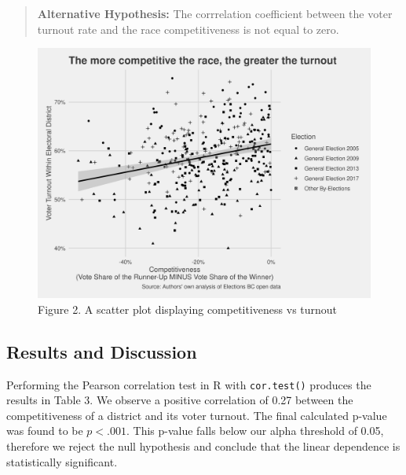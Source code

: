 \documentclass[
]{article}
\begin{document}
\begin{quote}
\textbf{Alternative Hypothesis:} The corrrelation coefficient between
the voter turnout rate and the race competitiveness is not equal to
zero.
\end{quote}

\begin{figure}
\includegraphics[width=1\linewidth]{images/scatter_plot} \caption{Figure 2. A scatter plot displaying competitiveness vs turnout}\label{fig:unnamed-chunk-3}
\end{figure}

\hypertarget{results-and-discussion}{%
\subsection{Results and Discussion}\label{results-and-discussion}}

Performing the Pearson correlation test in R with \texttt{cor.test()}
produces the results in Table 3. We observe a positive correlation of
0.27 between the competitiveness of a district and its voter turnout.
The final calculated p-value was found to be \(p < .001\). This p-value
falls below our alpha threshold of 0.05, therefore we reject the null
hypothesis and conclude that the linear dependence is statistically
significant.
\end{document}
